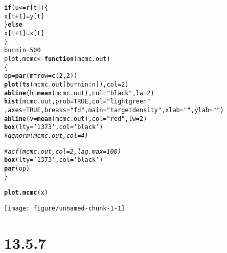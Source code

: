 \documentclass{article}\usepackage[]{graphicx}\usepackage[]{color}
\makeatletter
\def\maxwidth{ %
  \ifdim\Gin@nat@width>\linewidth
    \linewidth
  \else
    \Gin@nat@width
  \fi
}
\newcommand{\hlnum}[1]{\textcolor[rgb]{0.686,0.059,0.569}{#1}}%
\newcommand{\hlstr}[1]{\textcolor[rgb]{0.192,0.494,0.8}{#1}}%
\newcommand{\hlcom}[1]{\textcolor[rgb]{0.678,0.584,0.686}{\textit{#1}}}%
\newcommand{\hlopt}[1]{\textcolor[rgb]{0,0,0}{#1}}%
\newcommand{\hlstd}[1]{\textcolor[rgb]{0.345,0.345,0.345}{#1}}%
\newcommand{\hlkwa}[1]{\textcolor[rgb]{0.161,0.373,0.58}{\textbf{#1}}}%
\newcommand{\hlkwb}[1]{\textcolor[rgb]{0.69,0.353,0.396}{#1}}%
\newcommand{\hlkwc}[1]{\textcolor[rgb]{0.333,0.667,0.333}{#1}}%
\newcommand{\hlkwd}[1]{\textcolor[rgb]{0.737,0.353,0.396}{\textbf{#1}}}%
\newenvironment{kframe}{%
 \def\at@end@of@kframe{}%
 \ifinner\ifhmode%
  \def\at@end@of@kframe{\end{minipage}}%
  \begin{minipage}{\columnwidth}%
 \fi\fi%
 \def\FrameCommand##1{\hskip\@totalleftmargin \hskip-\fboxsep
 \colorbox{shadecolor}{##1}\hskip-\fboxsep
     \hskip-\linewidth \hskip-\@totalleftmargin \hskip\columnwidth}%
 \MakeFramed {\advance\hsize-\width
   \@totalleftmargin\z@ \linewidth\hsize
   \@setminipage}}%
 {\par\unskip\endMakeFramed%
 \at@end@of@kframe}
\newenvironment{knitrout}{}{} %
\makeatother
\begin{document}
\begin{knitrout}
\begin{kframe}
\begin{alltt}
\hlkwa{if}\hlstd{(u}\hlopt{<=}\hlstd{r[t])\{}
 \hlstd{x[t}\hlopt{+}\hlnum{1}\hlstd{]}\hlkwb{=}\hlstd{y[t]}
\hlstd{\}}\hlkwa{else}
  \hlstd{x[t}\hlopt{+}\hlnum{1}\hlstd{]}\hlkwb{=}\hlstd{x[t]}
\hlstd{\}}
\hlstd{burnin}\hlkwb{=}\hlnum{500}
\hlstd{plot.mcmc}\hlkwb{<-}\hlkwa{function}\hlstd{(}\hlkwc{mcmc.out}\hlstd{)}
\hlstd{\{}
  \hlstd{op}\hlkwb{=}\hlkwd{par}\hlstd{(}\hlkwc{mfrow}\hlstd{=}\hlkwd{c}\hlstd{(}\hlnum{2}\hlstd{,}\hlnum{2}\hlstd{))}
  \hlkwd{plot}\hlstd{(}\hlkwd{ts}\hlstd{(mcmc.out[burnin}\hlopt{:}\hlstd{n]),}\hlkwc{col}\hlstd{=}\hlnum{2}\hlstd{)}
  \hlkwd{abline}\hlstd{(}\hlkwc{h}\hlstd{=}\hlkwd{mean}\hlstd{(mcmc.out),}\hlkwc{col}\hlstd{=}\hlstr{"black"}\hlstd{,}\hlkwc{lw}\hlstd{=}\hlnum{2}\hlstd{)}
  \hlkwd{hist}\hlstd{(mcmc.out,}\hlkwc{prob}\hlstd{=}\hlnum{TRUE}\hlstd{,}\hlkwc{col}\hlstd{=}\hlstr{"lightgreen"}
       \hlstd{,}\hlkwc{axes}\hlstd{=}\hlnum{TRUE}\hlstd{,}\hlkwc{breaks} \hlstd{=} \hlstr{"fd"}\hlstd{,}\hlkwc{main}\hlstd{=}\hlstr{"  target density"}\hlstd{,}\hlkwc{xlab}\hlstd{=}\hlstr{""}\hlstd{,}\hlkwc{ylab}\hlstd{=}\hlstr{""}\hlstd{)}
  \hlkwd{abline}\hlstd{(}\hlkwc{v}\hlstd{=}\hlkwd{mean}\hlstd{(mcmc.out),}\hlkwc{col}\hlstd{=}\hlstr{"red"}\hlstd{,}\hlkwc{lw}\hlstd{=}\hlnum{2}\hlstd{)}
  \hlkwd{box}\hlstd{(}\hlkwc{lty} \hlstd{=} \hlstr{'1373'}\hlstd{,} \hlkwc{col} \hlstd{=} \hlstr{'black'}\hlstd{)}
  \hlcom{#qqnorm(mcmc.out,col=4)}

 \hlcom{# acf(mcmc.out,col=2,lag.max=100)}
  \hlkwd{box}\hlstd{(}\hlkwc{lty} \hlstd{=} \hlstr{'1373'}\hlstd{,} \hlkwc{col} \hlstd{=} \hlstr{'black'}\hlstd{)}
  \hlkwd{par}\hlstd{(op)}
\hlstd{\}}

\hlkwd{plot.mcmc}\hlstd{(x)}
\end{alltt}
\end{kframe}
\texttt{[image: figure/unnamed-chunk-1-1]} 

\end{knitrout}



\section{13.5.7}
\end{document}
